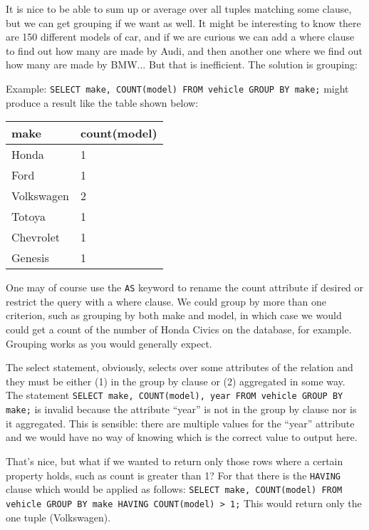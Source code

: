 It is nice to be able to sum up or average over all tuples matching some clause, but we can get grouping if we want as well. It might be interesting to know there are 150 different models of car, and if we are curious we can add a where clause to find out how many are made by Audi, and then another one where we find out how many are made by BMW... But that is inefficient. The solution is grouping:

Example: \texttt{SELECT make, COUNT(model) FROM vehicle GROUP BY make;} might produce a result like the table shown below:

\begin{center}
\begin{tabular}{|l|l|}\hline
	\textbf{make} & \textbf{count(model)} \\ \hline
	Honda & 1  \\ \hline
	Ford & 1  \\ \hline
	Volkswagen & 2  \\ \hline
	Totoya & 1  \\ \hline
	Chevrolet & 1  \\ \hline
	Genesis & 1  \\ \hline
\end{tabular}
\end{center}

One may of course use the \texttt{AS} keyword to rename the count attribute if desired or restrict the query with a where clause. We could group by more than one criterion, such as grouping by both make and model, in which case we would could get a count of the number of Honda Civics on the database, for example. Grouping works as you would generally expect. 

The select statement, obviously, selects over some attributes of the relation and they must be either (1) in the group by clause or (2) aggregated in some way. The statement \texttt{SELECT make, COUNT(model), year FROM vehicle GROUP BY make;} is invalid because the attribute ``year'' is not in the group by clause nor is it aggregated. This is sensible: there are multiple values for the ``year'' attribute and we would have no way of knowing which is the correct value to output here.


That's nice, but what if we wanted to return only those rows where a certain property holds, such as count is greater than 1? For that there is the \texttt{HAVING} clause which would be applied as follows: \texttt{SELECT make, COUNT(model) FROM vehicle GROUP BY make HAVING COUNT(model) > 1;} This would return only the one tuple (Volkswagen).

